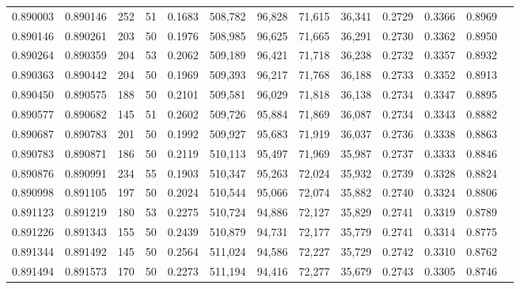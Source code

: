\begin{tabular}{rrrrrrrrrrrrr}
0.890003 & 0.890146 &   252 &  51 &                                     0.1683 & 508,782 &  96,828 &  71,615 &  36,341 & 0.2729 & 0.3366 & 0.8969 \\
0.890146 & 0.890261 &   203 &  50 &                                     0.1976 & 508,985 &  96,625 &  71,665 &  36,291 & 0.2730 & 0.3362 & 0.8950 \\
0.890264 & 0.890359 &   204 &  53 &                                     0.2062 & 509,189 &  96,421 &  71,718 &  36,238 & 0.2732 & 0.3357 & 0.8932 \\
0.890363 & 0.890442 &   204 &  50 &                                     0.1969 & 509,393 &  96,217 &  71,768 &  36,188 & 0.2733 & 0.3352 & 0.8913 \\
0.890450 & 0.890575 &   188 &  50 &                                     0.2101 & 509,581 &  96,029 &  71,818 &  36,138 & 0.2734 & 0.3347 & 0.8895 \\
0.890577 & 0.890682 &   145 &  51 &                                     0.2602 & 509,726 &  95,884 &  71,869 &  36,087 & 0.2734 & 0.3343 & 0.8882 \\
0.890687 & 0.890783 &   201 &  50 &                                     0.1992 & 509,927 &  95,683 &  71,919 &  36,037 & 0.2736 & 0.3338 & 0.8863 \\
0.890783 & 0.890871 &   186 &  50 &                                     0.2119 & 510,113 &  95,497 &  71,969 &  35,987 & 0.2737 & 0.3333 & 0.8846 \\
0.890876 & 0.890991 &   234 &  55 &                                     0.1903 & 510,347 &  95,263 &  72,024 &  35,932 & 0.2739 & 0.3328 & 0.8824 \\
0.890998 & 0.891105 &   197 &  50 &                                     0.2024 & 510,544 &  95,066 &  72,074 &  35,882 & 0.2740 & 0.3324 & 0.8806 \\
0.891123 & 0.891219 &   180 &  53 &                                     0.2275 & 510,724 &  94,886 &  72,127 &  35,829 & 0.2741 & 0.3319 & 0.8789 \\
0.891226 & 0.891343 &   155 &  50 &                                     0.2439 & 510,879 &  94,731 &  72,177 &  35,779 & 0.2741 & 0.3314 & 0.8775 \\
0.891344 & 0.891492 &   145 &  50 &                                     0.2564 & 511,024 &  94,586 &  72,227 &  35,729 & 0.2742 & 0.3310 & 0.8762 \\
0.891494 & 0.891573 &   170 &  50 &                                     0.2273 & 511,194 &  94,416 &  72,277 &  35,679 & 0.2743 & 0.3305 & 0.8746 \\

\end{tabular}
